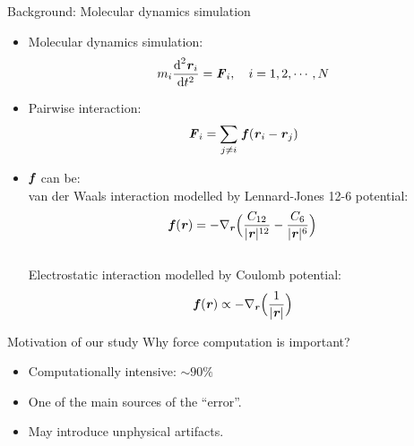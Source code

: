\documentclass{beamer}
\newcommand{\redc}[1]{{\color{red} #1}}
\newcommand{\bluec}[1]{{\color{blue} #1}}
\newcommand{\vect}[1]{\textbf{\textit{#1}}}
\renewcommand{\d}[1]{\textrm{#1}}
\begin{document}
\begin{frame}{Background: Molecular dynamics simulation}
  \begin{itemize}\itemsep -10pt
  \item<1-> Molecular dynamics simulation:
    \bluec{
      \begin{align*}
        m_i \frac{\d d^2\vect r_i}{\d dt^2} = \vect F_i, \quad i = 1, 2, \cdots, N
      \end{align*}
    }
  \item<2-> Pairwise interaction:
    \bluec{
      \begin{align*}
        \vect F_i = \sum_{j\neq i}\, \vect f(\vect r_i - \vect r_j)
      \end{align*}}
  \item<3-> \bluec{$\vect f$} can be:\\
    van der Waals interaction modelled by Lennard-Jones 12-6 potential:
    \bluec{
      \begin{align*}
        \vect f(\vect r) = -\nabla_{\vect r}
        \Big(
        \frac{C_{12}}{\vert\vect r\vert^{12}}
        -\frac{C_{6}}{\vert\vect r\vert^{6}}
        \Big)
      \end{align*}
    }\\
    Electrostatic interaction modelled by Coulomb potential:
    \bluec{
      \begin{align*}
        \vect f(\vect r) \propto -\nabla_{\vect r}
        \Big(
        \frac{1}{\vert \vect r\vert}
        \Big)
      \end{align*}}
  \end{itemize}
\end{frame}

\begin{frame}{Motivation of our study}
  Why force computation is important?
  \begin{itemize}\itemsep 3pt
  \item <2->Computationally intensive: \redc{$ \sim 90 \%$}
  \item <3->One of the main sources of the \redc{``error''}.
  \item <4->May introduce \redc{unphysical artifacts}.
  \end{itemize}
  \vfill
\end{frame}
\end{document}
